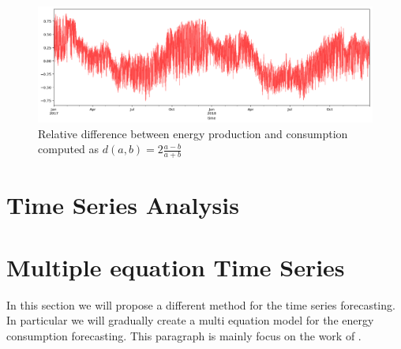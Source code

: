 \documentclass[12pt]{report}
\begin{document}
{\begin{figure}
    \centering
    \includegraphics[width=\textwidth]{relative_difference.png}
    \caption{Relative difference between energy production and consumption computed as $d(a,b) = 2\frac{a-b}{a+b}$}
    \label{rel_dif}
\end{figure}
\section{Time Series Analysis}

\section{Multiple equation Time Series}
In this section we will propose a different method for the time series forecasting. In particular we will gradually create a multi equation model for the energy consumption forecasting. This paragraph is mainly focus on the work of \cite{quteprints95170}.
}
\end{document}
